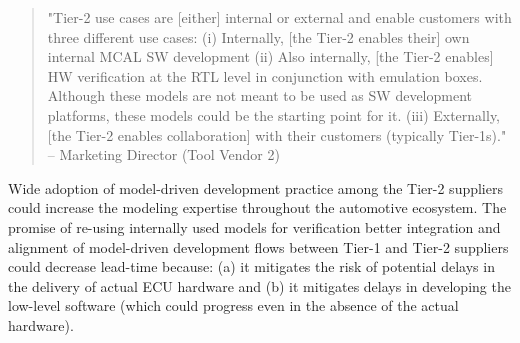 \begin{quote}
"Tier-2 use cases are [either] internal or external and enable customers with three different use cases: (i) Internally, [the Tier-2 enables their] own internal MCAL SW development (ii) Also internally, [the Tier-2 enables] HW verification at the RTL level in conjunction with emulation boxes. Although these models are not meant to be used as SW development platforms, these models could be the starting point for it. (iii) Externally, [the Tier-2 enables collaboration] with their customers (typically Tier-1s)."
-- Marketing Director (Tool Vendor 2)
\end{quote}

Wide adoption of model-driven development practice among the Tier-2 suppliers could increase the modeling expertise throughout the automotive ecosystem. The promise of re-using internally used models for verification better integration and alignment of model-driven development flows between Tier-1 and Tier-2 suppliers could decrease lead-time because: (a) it mitigates the risk of potential delays in the delivery of actual ECU hardware and (b) it mitigates delays in developing the low-level software (which could progress even in the absence of the actual hardware).
